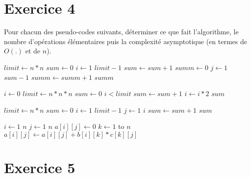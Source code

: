 \documentclass[a4paper,10pt]{article}
\begin{document}
\section*{Exercice 4}

Pour chacun des pseudo-codes suivants, déterminer ce que fait l'algorithme, le
nombre d'opérations élémentaires puis la complexité asymptotique (en termes de
$O(.)$ et de $n$).

\vspace{10pt}
\begin{codebox}
    \li $limit\gets n*n$
    \li $sum\gets 0$
    \li \For $i\gets 1$ \To $limit-1$
    \li \Do $sum\gets sum+1$
        \End
    \li $summ\gets 0$
    \li \For $j\gets 1$ \To $sum-1$
    \li \Do $summ\gets summ+1$
        \End
    \li \Return $summ$
    \End
\end{codebox}
\vspace{10pt}

\begin{codebox}
    \li $i\gets 0$
    \li $limit\gets n*n*n$
    \li $sum\gets 0$
    \li \While $i < limit$
    \li \Do $sum\gets sum+1$
    \li     $i\gets i*2$
        \End
    \li \Return $sum$
    \End
\end{codebox}
\vspace{10pt}

\begin{codebox}
    \li $limit\gets n*n$
    \li $sum\gets 0$
    \li \For $i\gets 1$ \To $limit-1$
    \li \Do \For $j\gets 1$ \To $i$
    \li     \Do $sum\gets sum+1$
            \End
        \End
    \li \Return $sum$
    \End
\end{codebox}
\vspace{10pt}

\begin{codebox}
    \li \For $i\gets 1$ \To $n$
    \li \Do \For $j\gets 1$ \To $n$
    \li     \Do $a[i][j]\gets 0$
    \li         \For $k\gets 1$ to $n$
    \li         \Do $a[i][j]\gets a[i][j] + b[i][k] * c[k][j]$
                \End
            \End
        \End
    \End
\end{codebox}
\vspace{10pt}

\section*{Exercice 5}
\end{document}
